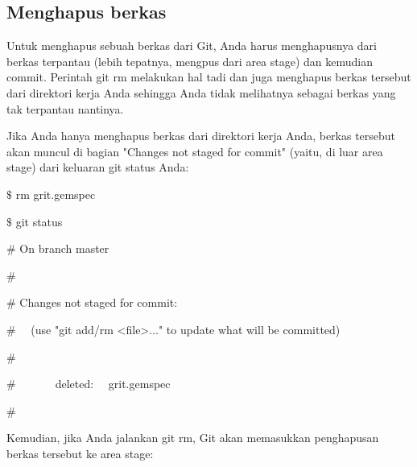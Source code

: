 \subsection {Menghapus berkas}
\noindent 
{\fontsize{14pt}{14pt}\selectfont Untuk menghapus sebuah berkas dari Git, Anda harus menghapusnya dari berkas terpantau (lebih tepatnya, mengpus dari area stage) dan kemudian commit. Perintah $  $git rm $  $melakukan hal tadi dan juga menghapus berkas tersebut dari direktori kerja Anda sehingga Anda tidak melihatnya sebagai berkas yang tak terpantau nantinya. \\} \par
\noindent 
{\fontsize{14pt}{14pt}\selectfont Jika Anda hanya menghapus berkas dari direktori kerja Anda, berkas tersebut akan muncul di bagian "Changes not staged for commit" (yaitu, di luar area stage) dari keluaran $  $git status $  $Anda: \\} \par
\vspace{14pt}
\noindent 
{\fontsize{14pt}{14pt}\selectfont  $  \$  $ rm grit.gemspec \\} \par
\noindent 
{\fontsize{14pt}{14pt}\selectfont  $  \$  $ git status \\} \par
\noindent 
{\fontsize{14pt}{14pt}\selectfont  $  \#  $ On branch master \\} \par
\noindent 
{\fontsize{14pt}{14pt}\selectfont  $  \#  $ \\} \par
\noindent 
{\fontsize{14pt}{14pt}\selectfont  $  \#  $ Changes not staged for commit: \\} \par
\noindent 
{\fontsize{14pt}{14pt}\selectfont  $  \#  $~~ (use "git add/rm <file>..." to update what will be committed) \\} \par
\noindent 
{\fontsize{14pt}{14pt}\selectfont  $  \#  $ \\} \par
\noindent 
{\fontsize{14pt}{14pt}\selectfont  $  \#  $~~~~~~~deleted:~~  grit.gemspec \\} \par
\noindent 
{\fontsize{14pt}{14pt}\selectfont  $  \#  $ \\} \par
\noindent 
{\fontsize{14pt}{14pt}\selectfont Kemudian, jika Anda jalankan $  $git rm, Git akan memasukkan penghapusan berkas tersebut ke area stage: \\} \par
